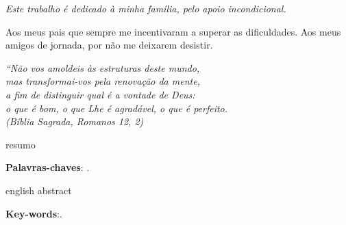 \begin{folhadeaprovacao}
   \begin{center}
    \vspace*{0.5cm}
    {\large\imprimirlocal}
    \par
    {\large\imprimirdata}
    \vspace*{1cm}
  \end{center}
  
\end{folhadeaprovacao}

\begin{dedicatoria}
   \vspace*{\fill}
   \centering
   \noindent
   \textit{ Este trabalho é dedicado à minha família, pelo apoio incondicional.} \vspace*{\fill}
\end{dedicatoria}

\begin{agradecimentos}
Aos meus pais que sempre me incentivaram a superar as dificuldades. 
Aos meus amigos de jornada, por não me deixarem desistir.


\end{agradecimentos}

\begin{epigrafe}
    \vspace*{\fill}
	\begin{flushright}
		\textit{``Não vos amoldeis às estruturas deste mundo, \\
		mas transformai-vos pela renovação da mente, \\
		a fim de distinguir qual é a vontade de Deus: \\
		o que é bom, o que Lhe é agradável, o que é perfeito.\\
		(Bíblia Sagrada, Romanos 12, 2)}
	\end{flushright}
\end{epigrafe}


\setlength{\absparsep}{18pt} %
\begin{resumo}
resumo
 

 \textbf{Palavras-chaves}: .
 
\end{resumo}

\begin{resumo}[Abstract]
 \begin{otherlanguage*}{english}
 abstract
   \vspace{\onelineskip}
 
   \noindent 
   \textbf{Key-words}:.
 \end{otherlanguage*}
\end{resumo}


